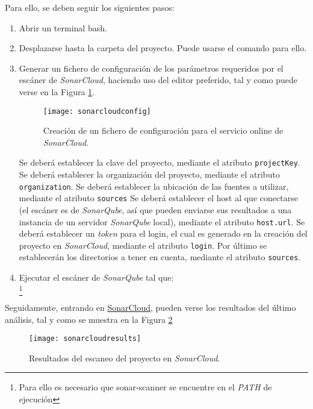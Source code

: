 Para ello, se deben seguir los siguientes pasos: 
\begin{enumerate}
\item Abrir un terminal bash.
\item Desplazarse hasta la carpeta del proyecto. Puede usarse el comando  para ello.
\item Generar un fichero de configuración de los parámetros requeridos por el escáner de \emph{SonarCloud}, haciendo uso del editor preferido, tal y como puede verse en la Figura \ref{fig:sonarcloudconfig}.
\begin{figure}[H]
	\centering
	\texttt{[image: sonarcloudconfig]}
	\caption[Configuración de SonarCloud]{Creación de un fichero de configuración para el servicio online de \emph{SonarCloud}.}\label{fig:sonarcloudconfig}
\end{figure}

Se deberá establecer la clave del proyecto, mediante el atributo \texttt{projectKey}.
Se deberá establecer la organización del proyecto, mediante el atributo \texttt{organization}.
Se deberá establecer la ubicación de las fuentes a utilizar, mediante el atributo \texttt{sources}
Se deberá establecer el host al que conectarse (el escáner es de \emph{SonarQube}, así que pueden enviarse sus resultados a una instancia de un servidor \emph{SonarQube} local), mediante el atributo \texttt{host.url}.
Se deberá establecer un \emph{token} para el login, el cual es generado en la creación del proyecto en \emph{SonarCloud}, mediante el atributo \texttt{login}.
Por último se establecerán los directorios a tener en cuenta, mediante el atributo \texttt{sources}.

\item Ejecutar el escáner de \emph{SonarQube} tal que:\\ \footnote{Para ello es necesario que sonar-scanner se encuentre en el \emph{PATH} de ejecución}
\end{enumerate}

Seguidamente, entrando en \href{https://sonarcloud.io/dashboard?id=GII_0_17.02_SNSI}{SonarCloud}, pueden verse los resultados del último análisis, tal y como se muestra en la Figura \ref{fig:sonarcloudresults}
\begin{figure}[H]
	\centering
	\texttt{[image: sonarcloudresults]}
	\caption[Resultados de SonarCloud]{Resultados del escaneo del proyecto en \emph{SonarCloud}.}\label{fig:sonarcloudresults}
\end{figure}


